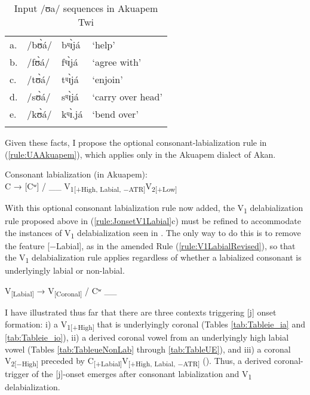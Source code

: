 \documentclass[output=paper,colorlinks,citecolor=brown]{langscibook}
\begin{document}
\begin{table}
\caption{Input /ʊa/ sequences in Akuapem Twi}
\label{tab:TableUAAkuap}
 \begin{tabular}{llll}
  \lsptoprule
a. &	/bʊ̀á/&	bᶣɪ̀já&	‘help’\\
b.&	/fʊ̀á/&	fᶣɪ̀já&	‘agree with’\\
c.	&/tʊ̀á/&	tᶣɪ̀já&	‘enjoin’\\
d.	&/sʊ̀á/	&sᶣɪ̀já&	‘carry over head’\\
e. &	/kʊ̀á/	&kᶣɪ̀.já&	‘bend over’\\
  \lspbottomrule
 \end{tabular}
\end{table}   

\begin{sloppypar}
\noindent Given these facts, I propose the optional consonant-labialization rule in (\ref{rule:UAAkuapem}), which applies only in the Akuapem dialect of Akan.  
\end{sloppypar}

\ea \label{rule:UAAkuapem}
\begin{xlist}
Consonant labialization (in Akuapem): \\
 C → [Cʷ] / \_\_  V\textsubscript{1[+High, Labial, −ATR]}V\textsubscript{2[+Low]}\\
\end{xlist}
\z

With this optional consonant labialization rule now added, the V\textsubscript{1} delabialization rule proposed above in (\ref{rule:JonsetV1Labial}c) must be refined to accommodate the instances of V\textsubscript{1} delabialization seen in . The only way to do this is to remove the feature [−Labial], as in the amended Rule (\ref{rule:V1LabialRevised}), so that the V\textsubscript{1} delabialization rule applies regardless of whether a  labialized consonant is underlyingly labial or non-labial. 

\ea \label{rule:V1LabialRevised}
\begin{xlist}
V\textsubscript{[Labial]} → V\textsubscript{[Coronal]} / Cʷ \_\_ \\
\end{xlist}
\z

I have illustrated thus far that there are three contexts triggering [j] onset formation: i) a V\textsubscript{1[+High]} that is underlyingly coronal (Tables \ref{tab:Tableie_ia} and \ref{tab:Tableie_io}), ii) a derived coronal vowel from an underlyingly high labial vowel (Tables \ref{tab:TableueNonLab} through \ref{tab:TableUE}), and iii) a coronal V\textsubscript{2[−High]} preceded by C\textsubscript{[+Labial]}V\textsubscript{[+High, Labial, −ATR]} (). Thus, a derived coronal-trigger of the [j]-onset emerges after consonant labialization and V\textsubscript{1} delabialization. 
\end{document}
